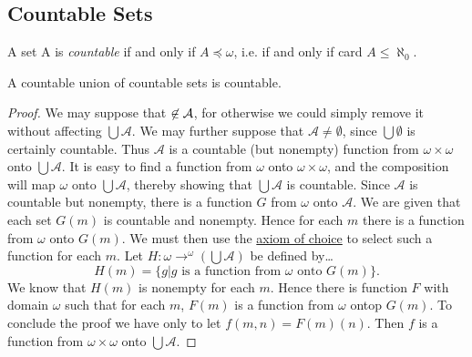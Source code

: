 \subsection{Countable Sets}\label{countable}
A set A is \emph{countable} if and only if $A \preceq \omega$, i.e. if and only if card $A \leq \aleph_0$.

\begin{theorem}
A countable union of countable sets is countable.
\end{theorem}

\begin{proof}
We may suppose that $\empty \not\in \mathcal{A}$, for otherwise we could simply remove it without affecting $\bigcup \mathcal{A}$. We may further suppose that $\mathcal{A} \neq \emptyset$,
since $\bigcup \emptyset$ is certainly countable. Thus $\mathcal{A}$ is a countable (but nonempty) function from $\omega \times \omega$ onto $\bigcup \mathcal{A}$. It is easy to find a function from $\omega$ onto $\omega \times \omega$,
and the composition will map $\omega$ onto $\bigcup \mathcal{A}$, thereby showing that $\bigcup \mathcal{A}$ is countable.
Since $\mathcal{A}$ is countable but nonempty, there is a function $G$ from $\omega$ onto $\mathcal{A}$. We are given that each set $G(m)$ is countable and nonempty. Hence for each $m$ there is a function from $\omega$ onto $G(m)$. We must then use
the \hyperref[axiomofchoice]{axiom of choice} to select such a function for each $m$.
Let $H: \omega \rightarrow ^{\omega}(\bigcup \mathcal{A})$ be defined by\dots
$$H(m) = \{g | g \textrm{ is a function from } \omega \textrm{ onto } G(m)\}.$$
We know that $H(m)$ is nonempty for each $m$. Hence there is function $F$ with domain $\omega$ such that for each $m$, $F(m)$ is a function from $\omega$ ontop $G(m)$.
To conclude the proof we have only to let $f(m,n) = F(m)(n)$. Then $f$ is a function from $\omega \times \omega$ onto $\bigcup \mathcal{A}$.
\end{proof}
